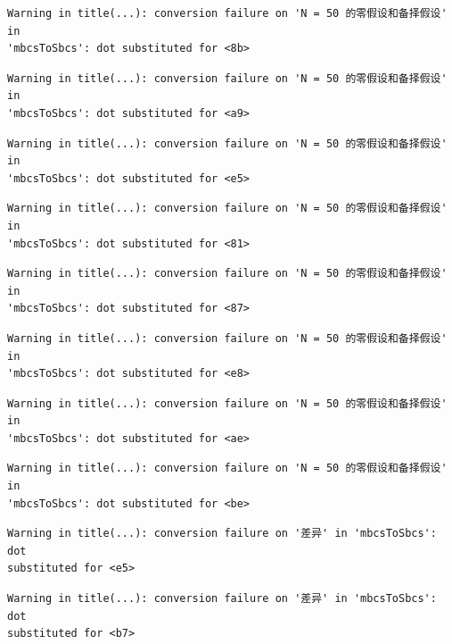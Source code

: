 \documentclass[
  letterpaper,
  DIV=11,
  numbers=noendperiod]{scrreprt}
\begin{document}
\begin{verbatim}
Warning in title(...): conversion failure on 'N = 50 的零假设和备择假设' in
'mbcsToSbcs': dot substituted for <8b>
\end{verbatim}

\begin{verbatim}
Warning in title(...): conversion failure on 'N = 50 的零假设和备择假设' in
'mbcsToSbcs': dot substituted for <a9>
\end{verbatim}

\begin{verbatim}
Warning in title(...): conversion failure on 'N = 50 的零假设和备择假设' in
'mbcsToSbcs': dot substituted for <e5>
\end{verbatim}

\begin{verbatim}
Warning in title(...): conversion failure on 'N = 50 的零假设和备择假设' in
'mbcsToSbcs': dot substituted for <81>
\end{verbatim}

\begin{verbatim}
Warning in title(...): conversion failure on 'N = 50 的零假设和备择假设' in
'mbcsToSbcs': dot substituted for <87>
\end{verbatim}

\begin{verbatim}
Warning in title(...): conversion failure on 'N = 50 的零假设和备择假设' in
'mbcsToSbcs': dot substituted for <e8>
\end{verbatim}

\begin{verbatim}
Warning in title(...): conversion failure on 'N = 50 的零假设和备择假设' in
'mbcsToSbcs': dot substituted for <ae>
\end{verbatim}

\begin{verbatim}
Warning in title(...): conversion failure on 'N = 50 的零假设和备择假设' in
'mbcsToSbcs': dot substituted for <be>
\end{verbatim}

\begin{verbatim}
Warning in title(...): conversion failure on '差异' in 'mbcsToSbcs': dot
substituted for <e5>
\end{verbatim}

\begin{verbatim}
Warning in title(...): conversion failure on '差异' in 'mbcsToSbcs': dot
substituted for <b7>
\end{verbatim}
\end{document}
